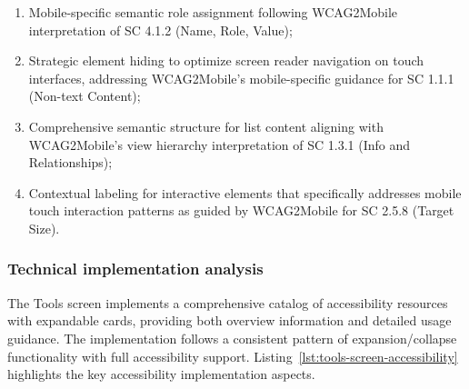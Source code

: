 \begin{enumerate}
    \item Mobile-specific semantic role assignment following WCAG2Mobile interpretation of SC 4.1.2 (Name, Role, Value);
    
    \item Strategic element hiding to optimize screen reader navigation on touch interfaces, addressing WCAG2Mobile's mobile-specific guidance for SC 1.1.1 (Non-text Content);
    
    \item Comprehensive semantic structure for list content aligning with WCAG2Mobile's view hierarchy interpretation of SC 1.3.1 (Info and Relationships);
    
    \item Contextual labeling for interactive elements that specifically addresses mobile touch interaction patterns as guided by WCAG2Mobile for SC 2.5.8 (Target Size).
\end{enumerate}

\subsubsection{Technical implementation analysis}

The Tools screen implements a comprehensive catalog of accessibility resources with expandable cards, providing both overview information and detailed usage guidance. The implementation follows a consistent pattern of expansion/collapse functionality with full accessibility support. Listing~\ref{lst:tools-screen-accessibility} highlights the key accessibility implementation aspects.


